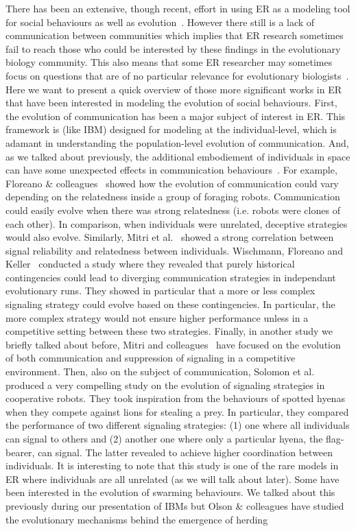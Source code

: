     There has been an extensive, though recent, effort in using ER as a modeling tool for social behaviours as well as evolution~\parencite{Mitri2012, Trianni2014b, Eiben2014, Doncieux2015a}. However there still is a lack of communication between communities which implies that ER research sometimes fail to reach those who could be interested by these findings in the evolutionary biology community. This also means that some ER researcher may sometimes focus on questions that are of no particular relevance for evolutionary biologists~\parencite{Trianni2014b, Doncieux2015a}. Here we want to present a quick overview of those more significant works in ER that have been interested in modeling the evolution of social behaviours. First, the evolution of communication has been a major subject of interest in ER. This framework is (like IBM) designed for modeling at the individual-level, which is adamant in understanding the population-level evolution of communication. And, as we talked about previously, the additional embodiement of individuals in space can have some unexpected effects in communication behaviours~\parencite{Mitri2009}. For example, Floreano \& colleagues~\parencite{Floreano2007} showed how the evolution of communication could vary depending on the relatedness inside a group of foraging robots. Communication could easily evolve when there was strong relatedness (i.e. robots were clones of each other). In comparison, when individuals were unrelated, deceptive strategies would also evolve. Similarly, Mitri et al.~\parencite{Mitri2011} showed a strong correlation between signal reliability and relatedness between individuals. Wischmann, Floreano and Keller~\parencite{Wischmann2012} conducted a study where they revealed that purely historical contingencies could lead to diverging communication strategies in independant evolutionary runs. They showed in particular that a more or less complex signaling strategy could evolve based on these contingencies. In particular, the more complex strategy would not ensure higher performance unless in a competitive setting between these two strategies. Finally, in another study we briefly talked about before, Mitri and colleagues~\parencite{Mitri2009} have focused on the evolution of both communication and suppression of signaling in a competitive environment. Then, also on the subject of communication, Solomon et al.~\parencite{Solomon2012} produced a very compelling study on the evolution of signaling strategies in cooperative robots. They took inspiration from the behaviours of spotted hyenas~\parencite{Smith2010} when they compete against lions for stealing a prey. In particular, they compared the performance of two different signaling strategies: (1) one where all individuals can signal to others and (2) another one where only a particular hyena, the flag-bearer, can signal. The latter revealed to achieve higher coordination between individuals. It is interesting to note that this study is one of the rare models in ER where individuals are all unrelated (as we will talk about later). Some have been interested in the evolution of swarming behaviours. We talked about this previously during our presentation of IBMs but Olson \& colleagues have studied the evolutionary mechanisms behind the emergence of herding 